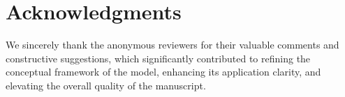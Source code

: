 \documentclass[authoryear,preprint,review,12pt]{elsarticle}
\begin{document}

\section*{Acknowledgments}

We sincerely thank the anonymous reviewers for their valuable comments and constructive suggestions, which significantly contributed to refining the conceptual framework of the model, enhancing its application clarity, and elevating the overall quality of the manuscript.

\baselineskip12pt
 
 
\end{document}
